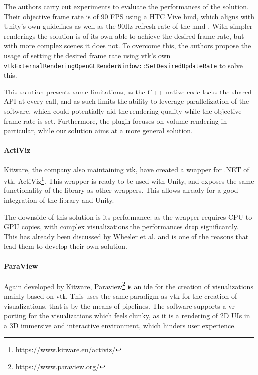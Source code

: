 The authors carry out experiments to evaluate the performances of the solution. Their objective frame rate is of 90 FPS using a HTC Vive \acrfull{hmd}, which aligns with Unity's own guidelines \cite{noauthor_vr_nodate-1} as well as the 90Hz refresh rate of the \acrshort{hmd} \cite{BuyVIVEH54}. With simpler renderings the solution is of its own able to achieve the desired frame rate, but with more complex scenes it does not. To overcome this, the authors propose the usage of setting the desired frame rate using \acrshort{vtk}'s own \verb|vtkExternalRenderingOpenGLRenderWindow::SetDesiredUpdateRate| to solve this.

This solution presents some limitations, as the C++ native code locks the shared API at every call, and as such limits the ability to leverage parallelization of the software, which could potentially aid the rendering quality while the objective frame rate is set. Furthermore, the plugin focuses on volume rendering in particular, while our solution aims at a more general solution. 

\paragraph{ActiViz}

Kitware, the company also maintaining \acrshort{vtk}, have created a wrapper for .NET of \acrshort{vtk}, ActiViz\footnote{\url{https://www.kitware.eu/activiz/}}. This wrapper is ready to be used with Unity, and exposes the same functionality of the library as other wrappers. This allows already for a good integration of the library and Unity.

The downside of this solution is its performance: as the wrapper requires CPU to GPU copies, with complex visualizations the performances drop significantly. This has already been discussed by Wheeler et al. \cite{wheeler_virtual_2018} and is one of the reasons that lead them to develop their own solution. 

\paragraph{ParaView}

Again developed by Kitware, Paraview\footnote{\url{https://www.paraview.org/}} is an \acrshort{ide} for the creation of visualizations mainly based on \acrshort{vtk}. This uses the same paradigm as \acrshort{vtk} for the creation of visualizations, that is by the means of pipelines. The software supports a \acrshort{vr} porting for the visualizations which feels clunky, as it is a rendering of 2D UIs in a 3D immersive and interactive environment, which hinders user experience.